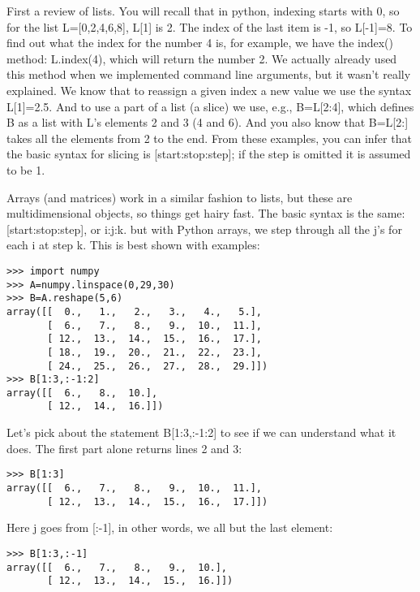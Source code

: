 {First a review of lists.   You will recall that in  python, indexing starts with 0, so for the list {\color{blue} L=[0,2,4,6,8], L[1]} is 2. The index of the last item is -1, so  {\color{blue}L[-1]}=8.  To find out what the index for the number 4 is, for example, we have the {\color{blue}index()} method:  {\color{blue}L.index(4}), which will return the number 2. We actually already used this method when we implemented command line arguments, but it wasn't really explained.   We know that to reassign a given index a new value we use the syntax {\color{blue}L[1]=2.5}.  
And to use a part of a list (a slice) we use, e.g.,    {\color{blue}B=L[2:4]}, which  defines  {\color{blue}B} as a list with  {\color{blue}L}'s elements 2 and 3 (4 and 6).  And you also know that  {\color{blue}B=L[2:]} takes all the elements from 2 to the end.  
From these examples, you can infer that the basic syntax for slicing is  {\color{blue}[start:stop:step]}; if the step is omitted it is assumed to be 1.  

Arrays (and matrices) work in a similar fashion to lists, but these are multidimensional objects, so things get hairy fast.
The basic syntax is the same:  {\color{blue}[start:stop:step]},  or  {\color{blue}i:j:k}.   but with Python arrays, we step through all the  {\color{blue}j}'s for each  {\color{blue}i}  at step  {\color{blue}k}.  This is best shown with examples:


{\singlespacing \color{blue} \begin{verbatim}
>>> import numpy
>>> A=numpy.linspace(0,29,30)
>>> B=A.reshape(5,6)
array([[  0.,   1.,   2.,   3.,   4.,   5.],
       [  6.,   7.,   8.,   9.,  10.,  11.],
       [ 12.,  13.,  14.,  15.,  16.,  17.],
       [ 18.,  19.,  20.,  21.,  22.,  23.],
       [ 24.,  25.,  26.,  27.,  28.,  29.]])
>>> B[1:3,:-1:2] 
array([[  6.,   8.,  10.],
       [ 12.,  14.,  16.]])
\end{verbatim}}

Let's pick about the statement {\color{blue}B[1:3,:-1:2]} to see if we can understand what it does.  The first part alone returns lines 2 and 3:
{\singlespacing \color{blue} \begin{verbatim}
>>> B[1:3]
array([[  6.,   7.,   8.,   9.,  10.,  11.],
       [ 12.,  13.,  14.,  15.,  16.,  17.]])
\end{verbatim}}

Here  {\color{blue}j} goes from [:-1], in other words, we all but the last element:

{\singlespacing \color{blue} \begin{verbatim}
>>> B[1:3,:-1]
array([[  6.,   7.,   8.,   9.,  10.],
       [ 12.,  13.,  14.,  15.,  16.]])
\end{verbatim}}

}
